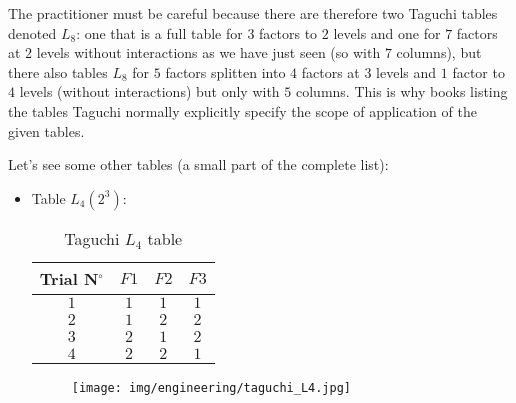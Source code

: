 	\begin{tcolorbox}[title=Remark,colframe=black,arc=10pt]
	The practitioner must be careful because there are therefore two Taguchi tables denoted $L_8$: one that is a full table for $3$ factors to $2$ levels and one for $7$ factors at $2$ levels without interactions as we have just seen (so with $7$ columns), but there also tables $L_8$ for $5$ factors splitten into $4$ factors at $3$ levels and $1$ factor to $4$ levels (without interactions) but only with $5$ columns. This is why books listing the tables Taguchi normally explicitly specify the scope of application of the given tables.
	\end{tcolorbox}
	Let's see some other tables (a small part of the complete list):
	\begin{itemize}
		\item Table $L_4 (2^3)$:
		\begin{table}[H]\centering
			\begin{center}
					\begin{tabular}{|c|c|c|c|}
						\hline
						\multicolumn{1}{c}{\cellcolor{black!30}\textbf{Trial N${}^\circ$}} & 
		  \multicolumn{1}{c}{\cellcolor{black!30}$F1$} & 
		  \multicolumn{1}{c}{\cellcolor{black!30}$F2$} & 
		  \multicolumn{1}{c}{\cellcolor{black!30}$F3$} \\ \hline
						$1$ & $1$ & $1$ & $1$\\ \hline
						$2$ & $1$ & $2$ & $2$\\ \hline
						$3$ & $2$ & $1$ & $2$\\ \hline
						$4$ & $2$ & $2$ & $1$\\ \hline
		 		\end{tabular}
			\end{center}
			\caption{Taguchi $L_4$ table}
		\end{table}
		\begin{figure}[H]
			\begin{center}
			\texttt{[image: img/engineering/taguchi\_L4.jpg]}
			\end{center}	
		\end{figure}
		

\end{itemize}
